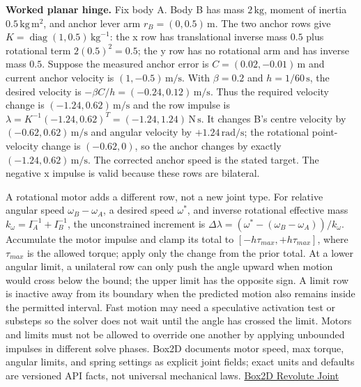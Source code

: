 \textbf{Worked planar hinge.} Fix body A. Body B has mass \(2\,\mathrm{kg}\), moment of inertia \(0.5\,\mathrm{kg\,m^2}\), and anchor lever arm \(r_B=(0,0.5)\,\mathrm m\). The two anchor rows give \(K=\operatorname{diag}(1,0.5)\,\mathrm{kg}^{-1}\): the x row has translational inverse mass \(0.5\) plus rotational term \(2(0.5)^2=0.5\); the y row has no rotational arm and has inverse mass \(0.5\). Suppose the measured anchor error is \(C=(0.02,-0.01)\,\mathrm m\) and current anchor velocity is \((1,-0.5)\,\mathrm{m/s}\). With \(\beta=0.2\) and \(h=1/60\,\mathrm s\), the desired velocity is \(-\beta C/h=(-0.24,0.12)\,\mathrm{m/s}\). Thus the required velocity change is \((-1.24,0.62)\,\mathrm{m/s}\) and the row impulse is \(\lambda=K^{-1}(-1.24,0.62)^T=(-1.24,1.24)\,\mathrm{N\,s}\). It changes B's centre velocity by \((-0.62,0.62)\,\mathrm{m/s}\) and angular velocity by \(+1.24\,\mathrm{rad/s}\); the rotational point-velocity change is \((-0.62,0)\), so the anchor changes by exactly \((-1.24,0.62)\,\mathrm{m/s}\). The corrected anchor speed is the stated target. The negative x impulse is valid because these rows are bilateral.

A rotational motor adds a different row, not a new joint type. For relative angular speed \(\omega_B-\omega_A\), a desired speed \(\omega^*\), and inverse rotational effective mass \(k_\omega=I_A^{-1}+I_B^{-1}\), the unconstrained increment is \(\Delta\lambda=(\omega^*-(\omega_B-\omega_A))/k_\omega\). Accumulate the motor impulse and clamp its total to \([-h\tau_{max},+h\tau_{max}]\), where \(\tau_{max}\) is the allowed torque; apply only the change from the prior total. At a lower angular limit, a unilateral row can only push the angle upward when motion would cross below the bound; the upper limit has the opposite sign. A limit row is inactive away from its boundary when the predicted motion also remains inside the permitted interval. Fast motion may need a speculative activation test or substeps so the solver does not wait until the angle has crossed the limit. Motors and limits must not be allowed to override one another by applying unbounded impulses in different solve phases. Box2D documents motor speed, max torque, angular limits, and spring settings as explicit joint fields; exact units and defaults are versioned API facts, not universal mechanical laws. \href{https://box2d.org/documentation/group__revolute__joint.html}{Box2D Revolute Joint}

